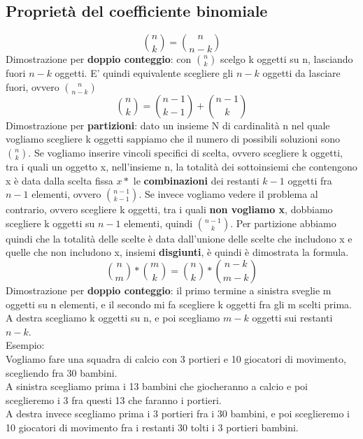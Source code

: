 \documentclass{report}
\begin{document}
    \subsection{Proprietà del coefficiente binomiale}
        $$\binom{n}{k} = \binom{n}{n-k}$$
        Dimostrazione per \textbf{doppio conteggio}: con $\binom{n}{k}$ scelgo k oggetti su n,
        lasciando fuori $n-k$ oggetti. E' quindi equivalente scegliere gli
        $n-k$ oggetti da lasciare fuori, ovvero $\binom{n}{n-k}$ \\
        $$\binom{n}{k} = \binom{n-1}{k-1} + \binom{n-1}{k}$$
        Dimostrazione per \textbf{partizioni}: dato un insieme N di cardinalità n
        nel quale vogliamo scegliere k oggetti sappiamo che il numero di possibili
        soluzioni sono $\binom{n}{k}$.
        Se vogliamo inserire vincoli specifici di scelta, ovvero scegliere k oggetti,
        tra i quali un oggetto x, nell'insieme n, la totalità dei 
        sottoinsiemi che contengono x è data dalla scelta fissa $x *$ le \textbf{combinazioni}
        dei restanti $k-1$ oggetti fra $n-1$ elementi, ovvero $\binom{n-1}{k-1}$.
        Se invece vogliamo vedere il problema al contrario, ovvero scegliere k oggetti,
        tra i quali \textbf{non vogliamo x}, dobbiamo scegliere k oggetti su $n-1$
        elementi, quindi $\binom{n-1}{k}$. Per partizione abbiamo quindi che la totalità
        delle scelte è data dall'unione delle scelte che includono x e quelle che non includono
        x, insiemi \textbf{disgiunti}, è quindi è dimostrata la formula. \\
        $$\binom{n}{m} * \binom{m}{k} = \binom{n}{k} * \binom{n-k}{m-k}$$
        Dimostrazione per \textbf{doppio conteggio}: il primo termine a sinistra
        sveglie m oggetti su n elementi, e il secondo mi fa scegliere
        k oggetti fra gli m scelti prima. A destra scegliamo k oggetti su n,
        e poi scegliamo $m-k$ oggetti sui restanti $n-k$. \\
        Esempio: \\
            Vogliamo fare una squadra di calcio con 3 portieri e 10 giocatori di movimento, 
            scegliendo fra 30 bambini. \\
            A sinistra scegliamo prima i 13 bambini che giocheranno a calcio e poi 
            sceglieremo i 3 fra questi 13 che faranno i portieri. \\
            A destra invece scegliamo prima i 3 portieri fra i 30 bambini, e poi
            sceglieremo i 10 giocatori di movimento fra i restanti 30 tolti i 3 portieri bambini.
\end{document}
